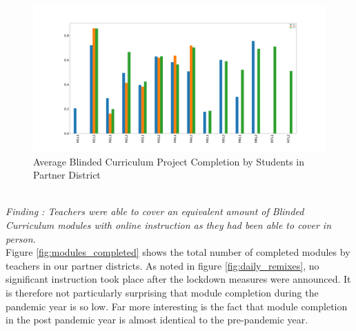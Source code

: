 \documentclass[sigconf,manuscript,review,anonymous]{acmart} %
\def\ts{TIPP\&SEE}
\newcommand{\Scratchencore}[0]{Blinded Curriculum}
\begin{document}
\begin{figure}
     \centering
     \includegraphics[width=\textwidth]{images/graphs/ProjectCompletion.png}
     \caption{Average \Scratchencore{} Project Completion by Students in Partner District}
     \label{fig:project_completion}
    
\end{figure}
\\
\textit{Finding : Teachers were able to cover an equivalent amount
of \Scratchencore{} modules with online instruction as they had been able to cover in person.}\\

Figure \ref{fig:modules_completed} shows the total number of completed modules by 
teachers in our partner districts. As noted in figure \ref{fig:daily_remixes}, 
no significant instruction took place after the lockdown measures were announced. It is 
therefore not particularly surprising that module completion during the pandemic year 
is so low. Far more interesting is the fact that module completion in the post pandemic 
year is almost identical to the pre-pandemic year. 
\end{document}

